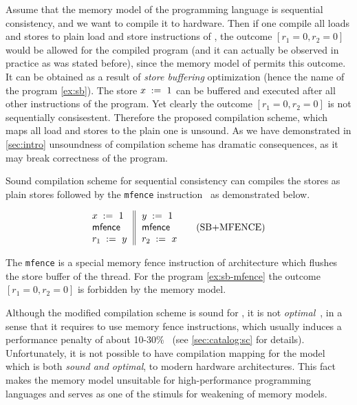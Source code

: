 Assume that the memory model of the programming language
is sequential consistency, and we want 
to compile it to \Intel hardware. 
Then if one compile all loads and stores 
to plain load and store instructions of \Intel,
the outcome $[r_1=0, r_2=0]$ would be 
allowed for the compiled program 
(and it can actually be observed in practice as was stated before), 
since the memory model of \Intel permits this outcome. 
It can be obtained as a result of \emph{store buffering}
optimization (hence the name of the program \ref{ex:sb}). 
The store $x\;:=_{}\;1$ can be buffered and 
executed after all other instructions of the program.  
Yet clearly the outcome $[r_1=0, r_2=0]$ is not sequentially consisestent. 
Therefore the proposed compilation scheme, 
which maps all load and stores to the plain one is unsound. 
As we have demonstrated in \cref{sec:intro} 
unsoundness of compilation scheme has 
dramatic consequences, as it may break 
correctness of the program. 

Sound compilation scheme for sequential consistency 
can compiles the stores as plain stores followed 
by the \texttt{mfence} instruction~\cite{Sewell-al:CACM10, Batty-al:POPL11} 
as demonstrated below. 

\begin{equation*}
\inarrII{
   \writeInst{}{x}{1}   \\
   \mfenceInst          \\
   \readInst{}{r_1}{y}  \\
}{
  \writeInst{}{y}{1}   \\
  \mfenceInst          \\
  \readInst{}{r_2}{x}  \\
}
\tag{SB+MFENCE}\label{ex:sb-mfence}
\end{equation*}


The \texttt{mfence} is a special memory fence instruction
of \Intel architecture which flushes the store buffer of the thread. 
For the program \ref{ex:sb-mfence} the outcome $[r_1=0, r_2=0]$
is forbidden by the \Intel memory model. 

Although the modified compilation scheme is sound for \SC, 
it is not \emph{optimal}~\cite{OptimalCompilationCPP}, 
in a sense that it requires to use memory fence instructions, 
which usually induces a performance penalty
of about 10-30\%~\cite{Marino-al:PLDI11, Liu-al:OOPSLA17}
(see \cref{sec:catalog:sc} for details).
Unfortunately, it is not possible to have compilation mapping 
for the \SC model which is both \emph{sound and optimal}, 
to modern hardware architectures.     
This fact makes the \SC memory model unsuitable  
for high-performance programming languages
and serves as one of the stimuls for 
weakening of memory models. 
 

